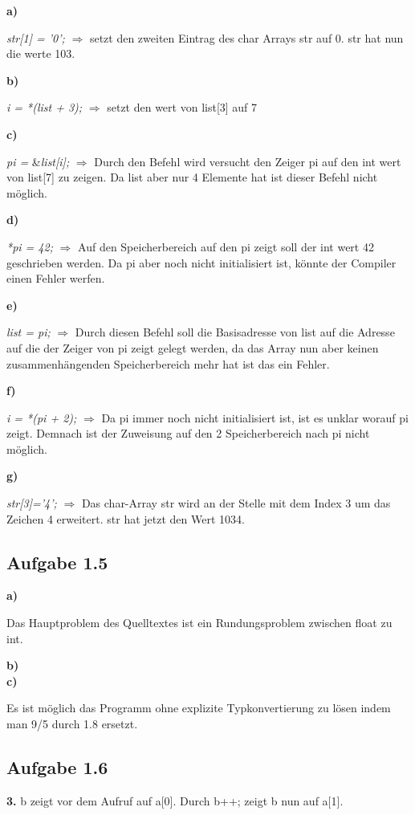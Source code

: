 \documentclass[a4paper,graphics,11pt]{article}
\newcommand{\aufgabe}[1]{\subsection*{Aufgabe #1}}
\begin{document}
\textbf{a)}

\textit{str[1] = ’0’;} $\Longrightarrow$ setzt den zweiten Eintrag des char Arrays str auf 0. str hat nun die werte 103.

\textbf{b)}

\textit{i = *(list + 3);} $\Longrightarrow$ setzt den wert von list[3] auf 7

\textbf{c)}

\textit{pi =  } \&\textit{list[i];} $\Longrightarrow$ Durch den Befehl wird versucht den Zeiger pi auf den int wert von list[7] zu zeigen. Da list aber nur 4 Elemente hat ist dieser Befehl nicht möglich.

\textbf{d)}

\textit{*pi = 42;} $\Longrightarrow$ Auf den Speicherbereich auf den pi zeigt soll der int wert 42 geschrieben werden. Da pi aber noch nicht initialisiert ist, könnte der Compiler einen Fehler werfen.

\textbf{e)}

\textit{list = pi;} $\Longrightarrow$ Durch diesen Befehl soll die Basisadresse von list auf die Adresse auf die der Zeiger von pi zeigt gelegt werden, da das Array nun aber keinen zusammenhängenden Speicherbereich mehr hat ist das ein Fehler.

\textbf{f)}

\textit{i = *(pi + 2);} $\Longrightarrow$ Da pi immer noch nicht initialisiert ist, ist es unklar worauf pi zeigt. Demnach ist der Zuweisung auf den 2 Speicherbereich nach pi nicht möglich.

\textbf{g)}

\textit{str[3]=’4’;} $\Longrightarrow$ Das char-Array str wird an der Stelle mit dem Index 3 um das Zeichen 4 erweitert. str hat jetzt den Wert 1034.

\newpage

\aufgabe{1.5}

\textbf{a)}

Das Hauptproblem des Quelltextes ist ein Rundungsproblem zwischen float zu int.

\textbf{b)}\\



\textbf{c)}

Es ist möglich das Programm ohne explizite Typkonvertierung zu lösen indem man 9/5 durch 1.8 ersetzt.

\aufgabe{1.6}

\textbf{3.} b zeigt vor dem Aufruf auf a[0]. Durch b++; zeigt b nun auf a[1].
\end{document}
